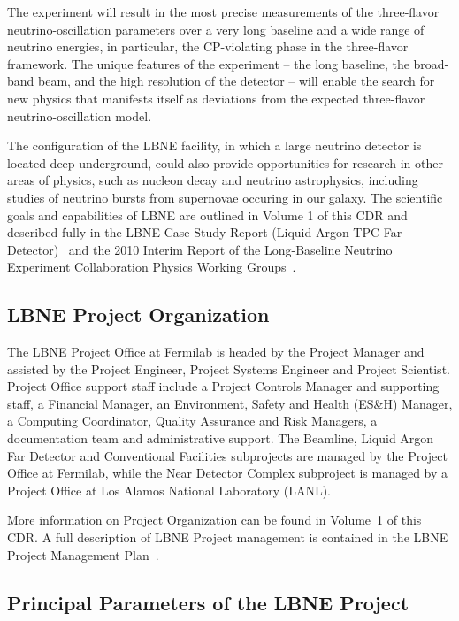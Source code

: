 The experiment will result in the most precise measurements of the three-flavor neutrino-oscillation parameters over a very long baseline and a wide range of neutrino energies, in particular, the CP-violating phase in the three-flavor framework.  The unique features of the experiment -- the long baseline, the broad-band beam, and the high resolution of the detector -- will enable the search for new physics that manifests itself as deviations from the expected three-flavor neutrino-oscillation model.

The configuration of the
LBNE facility, in which a large neutrino detector is located deep underground, could also provide
opportunities for research in other areas of physics, such as nucleon decay and neutrino
astrophysics, including studies of neutrino bursts from supernovae occuring in our galaxy. The
scientific goals and capabilities of LBNE are outlined in Volume 1 of this CDR and described fully in 
the LBNE Case Study Report
(Liquid Argon TPC Far Detector)~\cite{caseStudy} and the 2010 Interim Report of
the Long-Baseline Neutrino Experiment Collaboration Physics Working Groups~\cite{PWGIReport}.



\subsection{LBNE Project Organization}
The LBNE Project Office at Fermilab is headed by the Project Manager and assisted by the Project
Engineer, Project Systems Engineer and Project Scientist. Project Office support staff include a Project Controls Manager
and supporting staff, a Financial Manager, an Environment, Safety and Health (ES\&H) Manager, a Computing Coordinator, Quality Assurance and
Risk Managers, a documentation team and administrative support. 
The Beamline, Liquid Argon Far Detector and Conventional Facilities subprojects are managed by the Project Office at Fermilab, while the Near Detector Complex subproject is managed by a Project Office at Los Alamos National Laboratory (LANL).

More information on Project Organization can be found in Volume~1 of this CDR. A full description of LBNE 
Project management is contained in the LBNE Project Management Plan~\cite{PMP-2453}.

\subsection{Principal Parameters of the LBNE Project}

